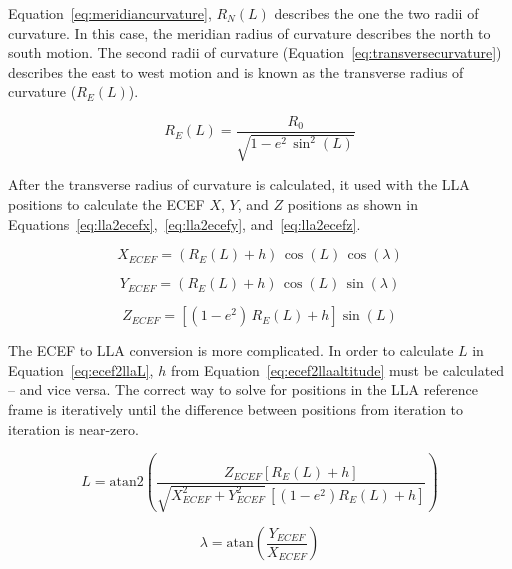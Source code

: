 Equation~\ref{eq:meridiancurvature}, \(R_N (L)\) describes the one the two radii of curvature. In this case, the meridian radius of curvature describes the north to south motion. The second radii of curvature (Equation~\ref{eq:transversecurvature}) describes the east to west motion and is known as the transverse radius of curvature (\(R_E (L) \)).

\begin{equation}\label{eq:transversecurvature}
    R_E (L) = \frac{R_0}{\sqrt{1 - e^2 \, \sin^2 {\left(L\right)}}}
\end{equation}

After the transverse radius of curvature is calculated, it used with the LLA positions to calculate the ECEF \(X\), \(Y\), and \(Z\) positions as shown in Equations~\ref{eq:lla2ecefx},~\ref{eq:lla2ecefy}, and~\ref{eq:lla2ecefz}.

\begin{equation}\label{eq:lla2ecefx}
    X_{ECEF} = \left(R_E (L) + h\right) \, \cos \left(L\right) \, \cos \left(\lambda\right)
\end{equation}

\begin{equation}\label{eq:lla2ecefy}
    Y_{ECEF} = \left(R_E (L) + h\right) \, \cos \left(L\right) \, \sin \left(\lambda\right)
\end{equation}

\begin{equation}\label{eq:lla2ecefz}
    Z_{ECEF} = \left[\left(1 - e^2\right) \, R_E (L) + h\right] \sin \left(L\right)
\end{equation}

The ECEF to LLA conversion is more complicated. In order to calculate \(L\) in Equation~\ref{eq:ecef2llaL}, \(h\) from Equation~\ref{eq:ecef2llaaltitude} must be calculated {--} and vice versa. The correct way to solve for positions in the LLA reference frame is iteratively until the difference between positions from iteration to iteration is near-zero.

\begin{equation}\label{eq:ecef2llaL}
    L = \textrm{atan2}\left(\frac{Z_{ECEF} \left[R_E (L) + h\right]}{\sqrt{X_{ECEF}^2 + Y^2_{ECEF}} \, \left[ \left(1 - e^2\right) R_E (L) + h\right]}\right)
\end{equation}

\begin{equation}\label{eq:ecef2llalambda}
    \lambda = \textrm{atan}\left(\frac{Y_{ECEF}}{X_{ECEF}}\right)
\end{equation}


